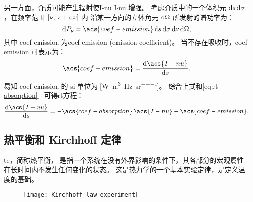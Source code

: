 另一方面，介质可能产生辐射使\acl{I-nu} \acs{I-nu} 增强。
考虑介质中的一个体积元 $\mathrm{d}s\,\mathrm{d}\sigma$，在频率范围 $[\nu, \,\nu+\mathrm{d}\nu]$ 内
沿某一方向的立体角元 $\mathrm{d}\Omega$ 所发射的谱功率为：
\begin{equation}
  \D{P_{\nu}} =
    \acs{coef-emission} \,\D{s}\,\D{\sigma}\,\D{\nu}\,\D{\Omega} ,
\end{equation}
其中 \acs{coef-emission} 为\acl{coef-emission} (emission coefficient)。
当不存在吸收时，\acs{coef-emission} 可表示为：
\begin{equation}
  \label{eq:coef-emission}
  \acs{coef-emission} = \diff{\acs{I-nu}}{s} .
\end{equation}
易知 \acs{coef-emission} 的 \ac{si} 单位为
[\si{\watt\per\cubic\meter\per\hertz\per\steradian}]。
综合上式和\autoref{eq:rt-absorption}，可得\ac{rt}方程：
\begin{equation}
  \label{eq:radiative-transfer}
  \diff{\acs{I-nu}}{s} =
    - \acs{coef-absorption} \,\acs{I-nu} + \acs{coef-emission} .
\end{equation}

\subsection{热平衡和 Kirchhoff 定律}

\acf{te}，简称热平衡，
是指一个系统在没有外界影响的条件下，其各部分的宏观属性在长时间内不发生任何变化的状态。
这是热力学的一个基本实验定律，是定义温度的基础。

\begin{figure}[htp]
  \centering
  \texttt{[image: Kirchhoff-law-experiment]}
  \label{fig:kirchhoff-experiment}
\end{figure}

